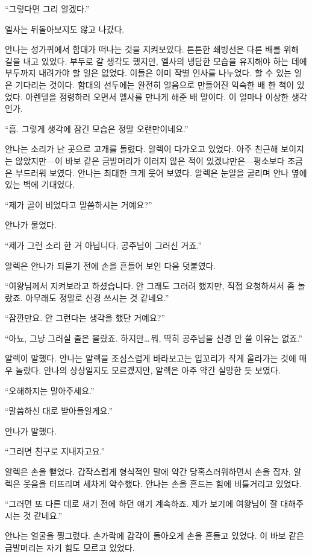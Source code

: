 ``그렇다면 그리 알겠다.''

엘사는 뒤돌아보지도 않고 나갔다.

\textbreak

안나는 성가퀴에서 함대가 떠나는 것을 지켜보았다. 튼튼한 쇄빙선은 다른 배를 위해 길을 내고 있었다. 부두로 갈 생각도 했지만, 엘사의 냉담한 모습을 유지해야 하는 데에 부두까지 내려가야 할 일은 없었다. 이들은 이미 작별 인사를 나누었다. 할 수 있는 일은 기다리는 것이다. 함대의 선두에는 완전히 얼음으로 만들어진 익숙한 배 한 척이 있었다. 아렌델을 점령하러 오면서 엘사를 만나게 해준 배 말이다. 이 얼마나 이상한 생각인가.

``흠. 그렇게 생각에 잠긴 모습은 정말 오랜만이네요.''

안나는 소리가 난 곳으로 고개를 돌렸다. 알렉이 다가오고 있었다. 아주 친근해 보이지는 않았지만—이 바보 같은 금발머리가 이러지 않은 적이 있겠냐만은—평소보다 조금은 부드러워 보였다. 안나는 최대한 크게 웃어 보였다. 알렉은 눈알을 굴리며 안나 옆에 있는 벽에 기대었다.

``제가 골이 비었다고 말씀하시는 거예요?''

안나가 물었다.

``제가 그런 소리 한 거 아닙니다. 공주님이 그러신 거죠.''

알렉은 안나가 되묻기 전에 손을 흔들어 보인 다음 덧붙였다.

``여왕님께서 지켜보라고 하셨습니다. 안 그래도 그러려 했지만, 직접 요청하셔서 좀 놀랐죠. 아무래도 정말로 신경 쓰시는 것 같네요.''

``잠깐만요. 안 그런다는 생각을 했단 거예요?''

``아뇨, 그냥 그러실 줄은 몰랐죠. 하지만\ldots\,뭐, 딱히 공주님을 신경 안 쓸 이유는 없죠.''

알렉이 말했다. 안나는 알렉을 조심스럽게 바라보고는 입꼬리가 작게 올라가는 것에 매우 놀랐다. 안나의 상상일지도 모르겠지만, 알렉은 아주 약간 실망한 듯 보였다.

``오해하지는 말아주세요.''

``말씀하신 대로 받아들일게요.''

안나가 말했다.

``그러면 친구로 지내자고요.''

알렉은 손을 뻗었다. 갑작스럽게 형식적인 말에 약간 당혹스러워하면서 손을 잡자, 알렉은 웃음을 터뜨리며 세차게 악수했다. 안나는 손을 흔드는 힘에 비틀거리고 있었다.

``그러면 또 다른 데로 새기 전에 하던 얘기 계속하죠. 제가 보기에 여왕님이 잘 대해주시는 것 같네요.''

안나는 얼굴을 찡그렸다. 손가락에 감각이 돌아오게 손을 흔들고 있었다. 이 바보 같은 금발머리는 자기 힘도 모르고 있었다.

